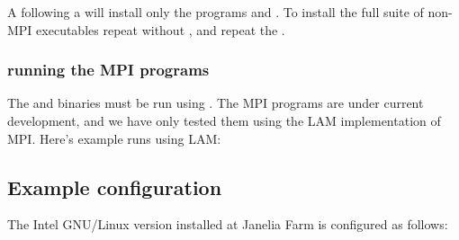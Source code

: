 
A  following a  will
install only the programs  and . To
install the full suite of non-MPI executables repeat 
without , and repeat the .

\subsubsection{running the MPI programs}
The  and  binaries must be run
using . The  MPI programs are under
current development, and we have only tested them using the LAM
implementation of MPI. Here's example runs using LAM:



\subsection{Example configuration}

The Intel GNU/Linux version installed at Janelia Farm is configured as
follows:






